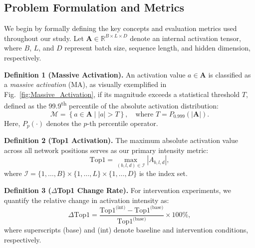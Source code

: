 \documentclass[conference]{IEEEtran}
\begin{document}
\subsection{Problem Formulation and Metrics}

We begin by formally defining the key concepts and evaluation metrics used throughout our study. Let $\mathbf{A} \in \mathbb{R}^{B \times L \times D}$ denote an internal activation tensor, where $B$, $L$, and $D$ represent batch size, sequence length, and hidden dimension, respectively.

\vspace{0.5em}
\noindent\textbf{Definition 1 (Massive Activation).} An activation value $a \in \mathbf{A}$ is classified as a \textit{massive activation} (MA), as visually exemplified in Fig.~\ref{fig:Massive_Activation}, if its magnitude exceeds a statistical threshold $T$, defined as the 99.9\textsuperscript{th} percentile of the absolute activation distribution:
\begin{equation}
\mathcal{M} = \left\{ a \in \mathbf{A} \mid |a| > T \right\}, \quad \text{where } T = P_{0.999}\left(|\mathbf{A}|\right).
\end{equation}
Here, $P_{p}(\cdot)$ denotes the $p$-th percentile operator.

\vspace{0.5em}
\noindent\textbf{Definition 2 (Top1 Activation).} The maximum absolute activation value across all network positions serves as our primary intensity metric:
\begin{equation}
\text{Top1} = \max_{(b,l,d) \in \mathcal{I}} |A_{b,l,d}|,
\end{equation}
where $\mathcal{I} = \{1,\dots,B\} \times \{1,\dots,L\} \times \{1,\dots,D\}$ is the index set.

\vspace{0.5em}
\noindent\textbf{Definition 3 ($\Delta$Top1 Change Rate).} For intervention experiments, we quantify the relative change in activation intensity as:
\begin{equation}
\Delta\text{Top1} = \frac{\text{Top1}^{\text{(int)}} - \text{Top1}^{\text{(base)}}}{\text{Top1}^{\text{(base)}}} \times 100\%,
\end{equation}
where superscripts (base) and (int) denote baseline and intervention conditions, respectively.
\end{document}
